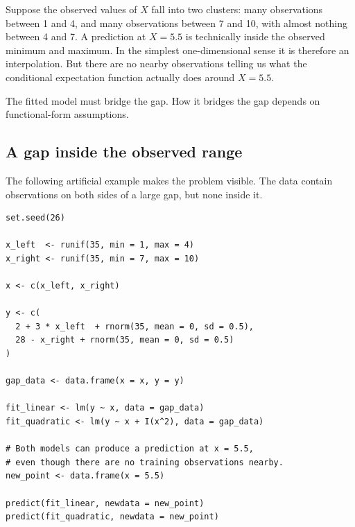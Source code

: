 \documentclass[11pt]{report}
\begin{document}
Suppose the observed values of \(X\) fall into two clusters: many observations between 1 and 4, and many observations between 7 and 10, with almost nothing between 4 and 7. A prediction at \(X=5.5\) is technically inside the observed minimum and maximum. In the simplest one-dimensional sense it is therefore an interpolation. But there are no nearby observations telling us what the conditional expectation function actually does around \(X=5.5\).

The fitted model must bridge the gap. How it bridges the gap depends on functional-form assumptions.

\begin{center}
\end{center}

\subsection{A gap inside the observed range}

The following artificial example makes the problem visible. The data contain observations on both sides of a large gap, but none inside it.

\begin{lstlisting}
set.seed(26)

x_left  <- runif(35, min = 1, max = 4)
x_right <- runif(35, min = 7, max = 10)

x <- c(x_left, x_right)

y <- c(
  2 + 3 * x_left  + rnorm(35, mean = 0, sd = 0.5),
  28 - x_right + rnorm(35, mean = 0, sd = 0.5)
)

gap_data <- data.frame(x = x, y = y)

fit_linear <- lm(y ~ x, data = gap_data)
fit_quadratic <- lm(y ~ x + I(x^2), data = gap_data)

# Both models can produce a prediction at x = 5.5,
# even though there are no training observations nearby.
new_point <- data.frame(x = 5.5)

predict(fit_linear, newdata = new_point)
predict(fit_quadratic, newdata = new_point)
\end{lstlisting}
\end{document}
